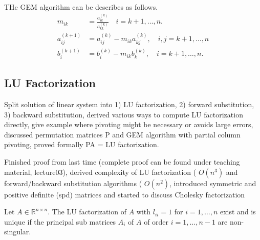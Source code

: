 \documentclass{article}
\theoremstyle{remark}
\begin{document}
 THe GEM algorithm can be describes as follows. 
 \begin{align}
   m_{ik} &= \frac{a_{ik}^{\left( k \right)}}{a_{kk}^{\left( k \right)}} \quad i = k+1 , \ldots, n. \\ 
   a_{ij}^{\left( k+1 \right)} &= a_{ij}^{\left( k \right)} - m_{ik} a _{kj}^{\left( k \right)}, \quad i,j = k+1, \ldots, n \\ 
   b_{i}^{\left( k+1 \right)} &= b_{i}^{\left( k \right)} - m_{ik}b_{k}^{\left( k \right)}, \quad i = k+1 , \ldots, n    
 .\end{align}

 

\subsection{LU Factorization}%
\label{sub:lu_factorization}
\begin{tcolorbox}
  Split solution of linear system into 1) LU factorization, 2) forward substitution, 3) backward substitution, derived various ways to compute LU factorization directly, give example where pivoting might be necessary or avoids large errors,  discussed permutation matrices P and GEM algorithm with partial column pivoting, proved formally PA = LU factorization. 
\end{tcolorbox}




\begin{tcolorbox}
  Finished proof from last time (complete proof can be found under teaching material, lecture03), derived complexity of LU factorization ( $O(n^3)$  and forward/backward substitution algorithms ( $O(n^2)$, introduced symmetric and positive definite (spd) matrices and started to discuss Cholesky factorization	
\end{tcolorbox}


\begin{theorem}
  Let $A \in \mathbb{R}^{n\times n }$. The LU factorization of $A$ with $l_{ii}=1$ for $i = 1, \ldots , n$ exist and is unique if the principal sub matrices $A_{i}$ of $A$ of order $i  = 1, \ldots, n-1$ are non-singular.
  \end{theorem}  
\end{document}
